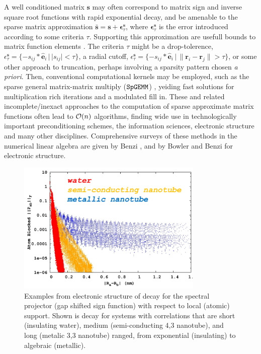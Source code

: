 \documentclass[letterpaper,twocolumn,amsmath,amsfont,amssymb,english,aps,jcp,preprintnumbers,groupaddress,nofootinbib,tightenlines]{revtex4}
\newcommand{\mat}[1]{\boldsymbol{#1}}
\begin{document}
A well conditioned matrix $\mat{s}$ may often correspond to matrix sign and inverse square root functions with rapid exponential decay, 
and be amenable to the sparse matrix approximation
$\bar{\mat{s}} = \mat{s}+ \mat{\epsilon}^{\mat{s}}_\tau$, where $\mat{\epsilon}^{\mat{s}}_\tau$ is the error introduced according to some  
criteria $\tau$.  Supporting this approximation are usefull bounds to matrix function elements \cite{Benzi99b, }.  
The criteria $\tau$ might be a drop-tolerence, 
$\epsilon^{\mat{s}}_{\tau} = \{-s_{ij}*\hat{\mat{e}}_i \, | \, |s_{ij}|<\tau \}$, a radial cutoff, 
$\epsilon^{\mat{s}}_{\tau} = \{-s_{ij}*\hat{\mat{e}}_i \, | \, \lVert \mat{r}_i - \mat{r}_j \rVert > \tau \}$, 
or some other approach to truncation, perhaps involving a sparsity pattern chosen {\em a priori}. 
Then, conventional computational kernels may be employed, such as the sparse general matrix-matrix multiply 
($\tt{SpGEMM}$) \cite{Gustavson78, Toledo97,challacombe00,bowler00}, yeiding fast solutions for multiplication rich iterations and a modulated fill in. 
These and related incomplete/inexact approaches to the computation of sparse approximate matrix functions often lead to ${\cal O}(n)$ 
algorithms, finding wide use in technologically important preconditioning schemes, the information sciences, electronic structure and many
other disciplines.  Comprehensive surveys of these methods in the numerical linear algebra are given by Benzi \cite{Benzi99,Benzi02}, and
by Bowler \cite{Bowler12} and Benzi \cite{Benzi13} for electronic structure.

\begin{figure}[t]\label{figure1}
 \includegraphics[width=3.5in]{decay_picture.png}
  \caption{Examples from electronic structure of decay for the spectral projector (gap shifted sign function) with respect to local (atomic) support.  
           Shown is decay for systems with correlations that are short (insulating water), medium (semi-conducting 4,3 nanotube), and 
           long (metalic 3,3 nanotube) ranged,  from exponential (insulating) to algebraic (metallic). }
\end{figure}
\end{document}
